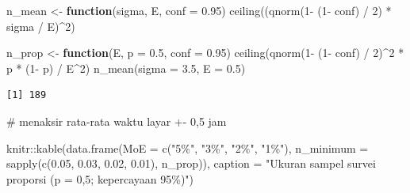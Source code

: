 \documentclass[
  indonesian,
  letterpaper,
]{book}
\newenvironment{Shaded}{\begin{snugshade}}{\end{snugshade}}
\newcommand{\AttributeTok}[1]{\textcolor[rgb]{0.40,0.45,0.13}{#1}}
\newcommand{\CommentTok}[1]{\textcolor[rgb]{0.37,0.37,0.37}{#1}}
\newcommand{\ControlFlowTok}[1]{\textcolor[rgb]{0.00,0.23,0.31}{\textbf{#1}}}
\newcommand{\DecValTok}[1]{\textcolor[rgb]{0.68,0.00,0.00}{#1}}
\newcommand{\FloatTok}[1]{\textcolor[rgb]{0.68,0.00,0.00}{#1}}
\newcommand{\FunctionTok}[1]{\textcolor[rgb]{0.28,0.35,0.67}{#1}}
\newcommand{\NormalTok}[1]{\textcolor[rgb]{0.00,0.23,0.31}{#1}}
\newcommand{\OtherTok}[1]{\textcolor[rgb]{0.00,0.23,0.31}{#1}}
\newcommand{\SpecialCharTok}[1]{\textcolor[rgb]{0.37,0.37,0.37}{#1}}
\newcommand{\StringTok}[1]{\textcolor[rgb]{0.13,0.47,0.30}{#1}}
\begin{document}
\begin{Shaded}
\begin{Highlighting}[]
\NormalTok{n\_mean }\OtherTok{\textless{}{-}} \ControlFlowTok{function}\NormalTok{(sigma, E, }\AttributeTok{conf =} \FloatTok{0.95}\NormalTok{) }\FunctionTok{ceiling}\NormalTok{((}\FunctionTok{qnorm}\NormalTok{(}\DecValTok{1}\SpecialCharTok{{-}}\NormalTok{ (}\DecValTok{1}\SpecialCharTok{{-}}\NormalTok{ conf) }\SpecialCharTok{/} \DecValTok{2}\NormalTok{) }\SpecialCharTok{*}
\NormalTok{sigma }\SpecialCharTok{/}\NormalTok{ E)}\SpecialCharTok{\^{}}\DecValTok{2}\NormalTok{)}

\NormalTok{n\_prop }\OtherTok{\textless{}{-}} \ControlFlowTok{function}\NormalTok{(E, }\AttributeTok{p =} \FloatTok{0.5}\NormalTok{, }\AttributeTok{conf =} \FloatTok{0.95}\NormalTok{) }\FunctionTok{ceiling}\NormalTok{(}\FunctionTok{qnorm}\NormalTok{(}\DecValTok{1}\SpecialCharTok{{-}}\NormalTok{ (}\DecValTok{1}\SpecialCharTok{{-}}\NormalTok{ conf) }\SpecialCharTok{/} \DecValTok{2}\NormalTok{)}\SpecialCharTok{\^{}}\DecValTok{2} \SpecialCharTok{*}
\NormalTok{p }\SpecialCharTok{*}\NormalTok{ (}\DecValTok{1}\SpecialCharTok{{-}}\NormalTok{ p) }\SpecialCharTok{/}\NormalTok{ E}\SpecialCharTok{\^{}}\DecValTok{2}\NormalTok{)}
\FunctionTok{n\_mean}\NormalTok{(}\AttributeTok{sigma =} \FloatTok{3.5}\NormalTok{, }\AttributeTok{E =} \FloatTok{0.5}\NormalTok{)}
\end{Highlighting}
\end{Shaded}

\begin{verbatim}
[1] 189
\end{verbatim}

\begin{Shaded}
\begin{Highlighting}[]
\CommentTok{\# menaksir rata{-}rata waktu layar +{-} 0,5 jam}
\end{Highlighting}
\end{Shaded}

\begin{Shaded}
\begin{Highlighting}[]
\NormalTok{knitr}\SpecialCharTok{::}\FunctionTok{kable}\NormalTok{(}\FunctionTok{data.frame}\NormalTok{(}\AttributeTok{MoE =} \FunctionTok{c}\NormalTok{(}\StringTok{"5\%"}\NormalTok{, }\StringTok{"3\%"}\NormalTok{, }\StringTok{"2\%"}\NormalTok{, }\StringTok{"1\%"}\NormalTok{),}
\AttributeTok{n\_minimum =} \FunctionTok{sapply}\NormalTok{(}\FunctionTok{c}\NormalTok{(}\FloatTok{0.05}\NormalTok{, }\FloatTok{0.03}\NormalTok{, }\FloatTok{0.02}\NormalTok{, }\FloatTok{0.01}\NormalTok{), n\_prop)),}
\AttributeTok{caption =} \StringTok{"Ukuran sampel survei proporsi (p = 0,5; kepercayaan 95\%)"}\NormalTok{)}
\end{Highlighting}
\end{Shaded}
\end{document}
